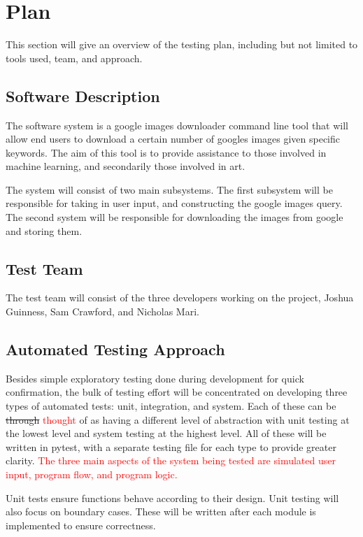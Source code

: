 \documentclass[12pt, titlepage]{article}
\begin{document}
\section{Plan} 

This section will give an overview of the testing plan, including but not limited to tools used, team, and approach.
	
\subsection{Software Description}

The software system is a google images downloader command line tool that will allow end users to download a certain number of googles images given specific keywords. The aim of this tool is to provide assistance to those involved in machine learning, and secondarily those involved in art.

The system will consist of two main subsystems. The first subsystem will be responsible for taking in user input, and constructing the google images query. The second system will be responsible for downloading the images from google and storing them. 

\subsection{Test Team}

The test team will consist of the three developers working on the project, Joshua Guinness, Sam Crawford, and Nicholas Mari.

\subsection{Automated Testing Approach}

Besides simple exploratory testing done during development for quick confirmation, the bulk of testing effort will be 
concentrated on developing three types of automated tests: unit, integration, and system. Each of these can be \sout{through} 
\textcolor{red}{thought} of as having a different level of abstraction with unit testing at the lowest level and system testing at the highest 
level. All of these will be written in pytest, with a separate testing file for each type to provide greater clarity.
\textcolor{red}{The three main aspects of the system being tested are simulated user input, program flow, and program logic.}

Unit tests ensure functions behave according to their design. Unit testing will also focus on boundary cases. These will be written after each module is implemented to ensure correctness.
\end{document}
